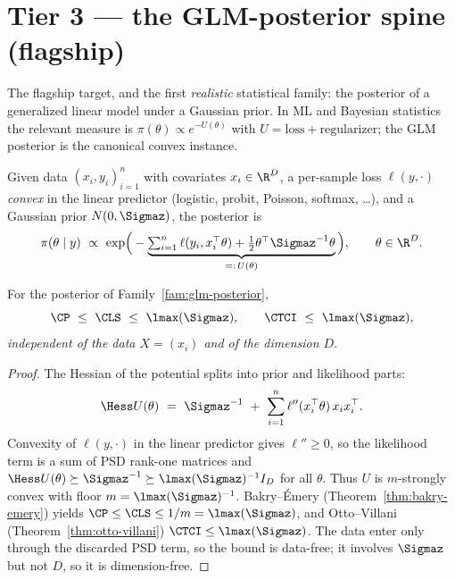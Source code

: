 \documentclass[../main.tex]{subfiles}
\begin{document}
\section{Tier 3 --- the GLM-posterior spine (flagship)}
\label{sec:tier3}

The flagship target, and the first \emph{realistic} statistical family: the posterior of a
generalized linear model under a Gaussian prior. In ML and Bayesian statistics the relevant
measure is $\pi(\theta)\propto e^{-U(\theta)}$ with $U=\text{loss}+\text{regularizer}$; the
GLM posterior is the canonical convex instance.

\begin{family}
\label{fam:glm-posterior}
Given data $(x_i,y_i)_{i=1}^n$ with covariates $x_i\in\R^D$, a per-sample loss
$\ell(y,\cdot)$ \emph{convex} in the linear predictor (logistic, probit, Poisson, softmax,
\dots), and a Gaussian prior $N(0,\Sigmaz)$, the posterior is
\[
  \pi(\theta\mid y)\ \propto\ \exp\!\Big(-\underbrace{\textstyle\sum_{i=1}^n\ell(y_i,x_i^\top\theta)
  +\tfrac12\theta^\top\Sigmaz^{-1}\theta}_{=:\,U(\theta)}\Big),\qquad\theta\in\R^D .
\]
\end{family}

\begin{theorem}
\label{thm:glm-fi}
For the posterior of Family~\ref{fam:glm-posterior},
\[
  \CP\ \le\ \CLS\ \le\ \lmax(\Sigmaz),
  \qquad
  \CTCI\ \le\ \lmax(\Sigmaz),
\]
\emph{independent of the data $X=(x_i)$ and of the dimension $D$}.
\end{theorem}

\begin{proof}
The Hessian of the potential splits into prior and likelihood parts:
\[
  \Hess U(\theta)\ =\ \Sigmaz^{-1}\ +\ \sum_{i=1}^n \ell''(x_i^\top\theta)\,x_ix_i^\top .
\]
Convexity of $\ell(y,\cdot)$ in the linear predictor gives $\ell''\ge0$, so the likelihood
term is a sum of PSD rank-one matrices and
$\Hess U(\theta)\succeq\Sigmaz^{-1}\succeq\lmax(\Sigmaz)^{-1}I_D$ for all $\theta$. Thus $U$
is $m$-strongly convex with floor $m=\lmax(\Sigmaz)^{-1}$. Bakry--\'Emery
(Theorem~\ref{thm:bakry-emery}) yields $\CP\le\CLS\le1/m=\lmax(\Sigmaz)$, and Otto--Villani
(Theorem~\ref{thm:otto-villani}) $\CTCI\le\lmax(\Sigmaz)$. The data enter only through the
discarded PSD term, so the bound is data-free; it involves $\Sigmaz$ but not $D$, so it is
dimension-free.
\end{proof}
\end{document}
